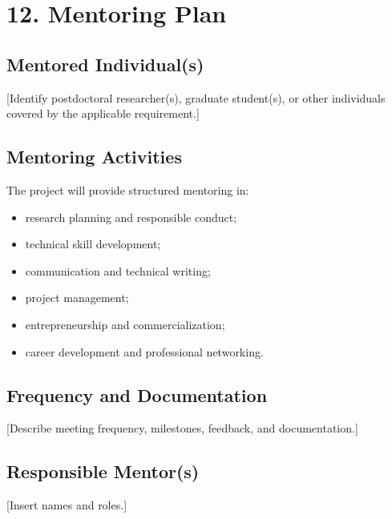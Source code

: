 \documentclass[11pt,letterpaper]{article}
\begin{document}
\section*{12. Mentoring Plan}


\subsection*{Mentored Individual(s)}
[Identify postdoctoral researcher(s), graduate student(s), or other individuals
covered by the applicable requirement.]

\subsection*{Mentoring Activities}
The project will provide structured mentoring in:
\begin{itemize}
\item research planning and responsible conduct;
\item technical skill development;
\item communication and technical writing;
\item project management;
\item entrepreneurship and commercialization;
\item career development and professional networking.
\end{itemize}

\subsection*{Frequency and Documentation}
[Describe meeting frequency, milestones, feedback, and documentation.]

\subsection*{Responsible Mentor(s)}
[Insert names and roles.]
\end{document}
